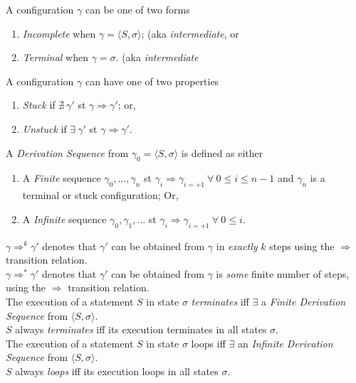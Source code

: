 \documentclass[11pt,a4paper]{article}
\begin{document}
A configuration $\gamma$ can be one of two forms
\begin{enumerate}[label=\roman*)]
	\item \textit{Incomplete} when $\gamma=\langle S,\sigma\rangle$; (aka \textit{intermediate}, or
	\item \textit{Terminal} when $\gamma=\sigma$. (aka \textit{intermediate}
\end{enumerate}

A configuration $\gamma$ can have one of two properties
\begin{enumerate}[label=\roman*)]
	\item \textit{Stuck} if $\nexists\ \gamma'$ st $\gamma\Rightarrow\gamma'$; or,
	\item \textit{Unstuck} if $\exists\ \gamma'$ st $\gamma\Rightarrow\gamma'$.
\end{enumerate}

A \textit{Derivation Sequence} from $\gamma_0=\langle S,\sigma\rangle$ is defined as either
\begin{enumerate}[label=\roman*)]
	\item A \textit{Finite} sequence $\gamma_0,\dots,\gamma_n$ st $\gamma_i\Rightarrow\gamma_{i=+1}\ \forall\ 0\leq i\leq n-1$ and $\gamma_n$ is a terminal or stuck configuration; Or,
	\item A \textit{Infinite} sequence $\gamma_0,\gamma_1,\dots$ st $\gamma_i\Rightarrow\gamma_{i=+1}\ \forall\ 0\leq i$.
\end{enumerate}

$\gamma\Rightarrow^k\gamma'$ denotes that $\gamma'$ can be obtained from $\gamma$ in \textit{exactly} $k$ steps using the $\Rightarrow$ transition relation.\\
$\gamma\Rightarrow^*\gamma'$ denotes that $\gamma'$ can be obtained from $\gamma$ is \textit{some} finite number of steps, using the $\Rightarrow$ transition relation.\\

The execution of a statement $S$ in state $\sigma$ \textit{terminates} iff $\exists$ a \textit{Finite Derivation Sequence} from $\langle S,\sigma\rangle$.\\
$S$ always \textit{terminates} iff its execution terminates in all states $\sigma$.\\

The execution of a statement $S$ in state $\sigma$ loops iff $\exists$ an \textit{Infinite Derivation Sequence} from $\langle S,\sigma\rangle$.\\
$S$ always \textit{loops} iff its execution loops in all states $\sigma$.\\
\end{document}
